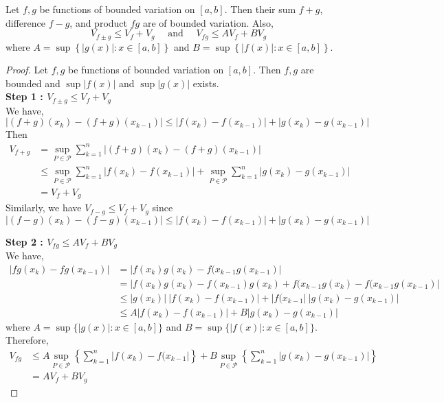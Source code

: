 \begin{theorem}
	Let $f,g$ be functions of bounded variation on $[a,b]$.
	Then their sum $f+g$, difference $f-g$, and product $fg$ are of bounded variation.
	Also, 
	\[ V_{f \pm g} \le V_f + V_g \quad \text{ and } \quad V_{fg} \le AV_f + BV_g \]
	where $\displaystyle A = \sup \left\{ |g(x)| : x \in [a,b] \right\}$ and $\displaystyle B = \sup \left\{ |f(x)| : x \in [a,b] \right\}$.
\end{theorem}
\begin{proof}
	Let $f,g$ be functions of bounded variation on $[a,b]$.
	Then $f,g$ are bounded and $\sup |f(x)|$ and $\sup |g(x)|$ exists.\\

	\textbf{Step 1 : $V_{f \pm g} \le V_f + V_g$}\\
	We have,
	\[ |(f+g)(x_k) - (f+g)(x_{k-1})| \le | f(x_k) - f(x_{k-1})| + |g(x_k) - g(x_{k-1})| \]
	Then
	\begin{align*}
	V_{f+g}  
		& = \sup_{P \in \mathscr{P}} \sum_{k=1}^n |(f+g)(x_k) - (f+g)(x_{k-1})| \\
		& \le \sup_{P \in \mathscr{P}} \sum_{k=1}^n |f(x_k) - f(x_{k-1})| + \sup_{P \in \mathscr{P}} \sum_{k=1}^n |g(x_k)-g(x_{k-1})| \\
		& = V_f + V_g 
\end{align*}
	Similarly, we have $V_{f-g} \le V_f + V_g$ since
	\[ |(f-g)(x_k) - (f-g)(x_{k-1})| \le |f(x_k)-f(x_{k-1})| + |g(x_k)-g(x_{k-1})| \]

	\textbf{Step 2 : $V_{fg} \le AV_f + BV_g$}\\
	We have,
	\begin{align*}
	|fg(x_k)-fg(x_{k-1})| 
		& = |f(x_k)g(x_k) - f(x_{k-1}g(x_{k-1})| \\
		& = |f(x_k)g(x_k) - f(x_{k-1})g(x_k) + f(x_{k-1}g(x_k) - f(x_{k-1}g(x_{k-1}) | \\
		& \le |g(x_k)|\ |f(x_k)-f(x_{k-1})| + |f(x_{k-1}|\ |g(x_k) - g(x_{k-1})| \\
		& \le A |f(x_k)-f(x_{k-1})| + B |g(x_k)-g(x_{k-1})|
	\end{align*}
	where $A = \sup \{ |g(x)| : x \in [a,b] \}$ and $B = \sup \{ |f(x)| : x \in [a,b] \}$.\\

	Therefore,
	\begin{align*}
	V_{fg} 
		& \le A \sup_{P \in \mathscr{P}} \left\{ \sum_{k=1}^n |f(x_k)-f(x_{k-1}| \right\} + B \sup_{P \in \mathscr{P}} \left\{ \sum_{k=1}^n |g(x_k)-g(x_{k-1})| \right\} \\
		& = AV_f + BV_g 
	\end{align*}
\end{proof}

